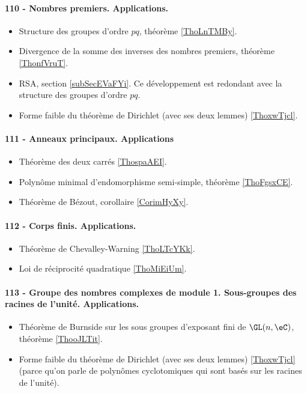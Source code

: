 \paragraph{110 - Nombres premiers. Applications.}
\begin{itemize}
    \item Structure des groupes d'ordre \( pq\), théorème \ref{ThoLnTMBy}.
    \item Divergence de la somme des inverses des nombres premiers, théorème \ref{ThonfVruT}.
    \item RSA, section \ref{subSecEVaFYi}. Ce développement est redondant avec la structure des groupes d'ordre \( pq\).
    \item Forme faible du théorème de Dirichlet (avec ses deux lemmes) \ref{ThoxwTjcl}.
\end{itemize}

\paragraph{111 - Anneaux principaux. Applications}
\begin{itemize}
    \item Théorème des deux carrés \ref{ThospaAEI}.
    \item Polynôme minimal d'endomorphisme semi-simple, théorème \ref{ThoFgsxCE}.
    \item Théorème de Bézout, corollaire \ref{CorimHyXy}.
\end{itemize}
\paragraph{112 - Corps finis. Applications.}
\begin{itemize}
    \item Théorème de Chevalley-Warning \ref{ThoLTcYKk}.
    \item Loi de réciprocité quadratique \ref{ThoMiEiUm}.
\end{itemize}
\paragraph{113 - Groupe des nombres complexes de module 1. Sous-groupes des racines de l’unité. Applications.}
\begin{itemize}
    \item Théorème de Burnside sur les sous groupes d'exposant fini de \( \GL(n,\eC)\), théorème \ref{ThooJLTit}.
    \item Forme faible du théorème de Dirichlet (avec ses deux lemmes) \ref{ThoxwTjcl} (parce qu'on parle de polynômes cyclotomiques qui sont basés sur les racines de l'unité).
\end{itemize}
